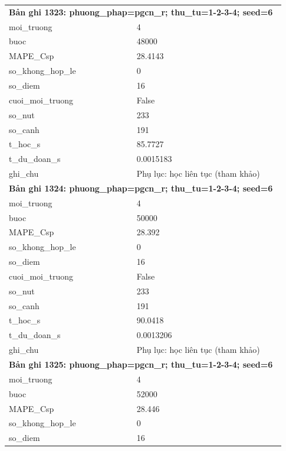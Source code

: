 \begin{longtable}{p{0.43\linewidth}p{0.50\linewidth}}
\midrule
\multicolumn{2}{p{0.95\linewidth}}{\textbf{Bản ghi 1323: phuong\_phap=pgcn\_r; thu\_tu=1-2-3-4; seed=6}} \\
moi\_\allowbreak truong & 4 \\
buoc & 48000 \\
MAPE\_\allowbreak Csp & 28.4143 \\
so\_\allowbreak khong\_\allowbreak hop\_\allowbreak le & 0 \\
so\_\allowbreak diem & 16 \\
cuoi\_\allowbreak moi\_\allowbreak truong & False \\
so\_\allowbreak nut & 233 \\
so\_\allowbreak canh & 191 \\
t\_\allowbreak hoc\_\allowbreak s & 85.7727 \\
t\_\allowbreak du\_\allowbreak doan\_\allowbreak s & 0.0015183 \\
ghi\_\allowbreak chu & Phụ lục: học liên tục (tham khảo) \\
\midrule
\multicolumn{2}{p{0.95\linewidth}}{\textbf{Bản ghi 1324: phuong\_phap=pgcn\_r; thu\_tu=1-2-3-4; seed=6}} \\
moi\_\allowbreak truong & 4 \\
buoc & 50000 \\
MAPE\_\allowbreak Csp & 28.392 \\
so\_\allowbreak khong\_\allowbreak hop\_\allowbreak le & 0 \\
so\_\allowbreak diem & 16 \\
cuoi\_\allowbreak moi\_\allowbreak truong & False \\
so\_\allowbreak nut & 233 \\
so\_\allowbreak canh & 191 \\
t\_\allowbreak hoc\_\allowbreak s & 90.0418 \\
t\_\allowbreak du\_\allowbreak doan\_\allowbreak s & 0.0013206 \\
ghi\_\allowbreak chu & Phụ lục: học liên tục (tham khảo) \\
\midrule
\multicolumn{2}{p{0.95\linewidth}}{\textbf{Bản ghi 1325: phuong\_phap=pgcn\_r; thu\_tu=1-2-3-4; seed=6}} \\
moi\_\allowbreak truong & 4 \\
buoc & 52000 \\
MAPE\_\allowbreak Csp & 28.446 \\
so\_\allowbreak khong\_\allowbreak hop\_\allowbreak le & 0 \\
so\_\allowbreak diem & 16 \\

\end{longtable}
